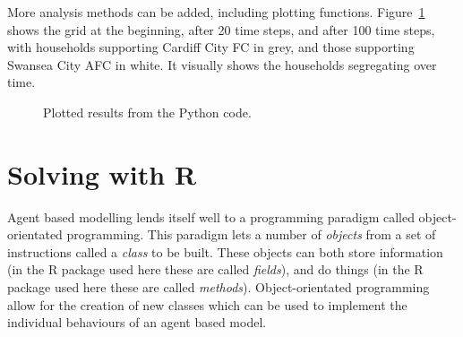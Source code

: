 More analysis methods can be added, including plotting functions.
Figure~\ref{fig:schelling_python_plot} shows the grid at the beginning, after 20
time steps, and after 100 time steps, with households supporting Cardiff City FC
in grey, and those supporting Swansea City AFC in white.
It visually shows the households segregating over time.

\begin{figure}
\begin{center}
\end{center}
\caption{Plotted results from the Python code.}
\label{fig:schelling_python_plot}
\end{figure}

\section{Solving with R}\label{sec:agent_based_simulation_solving-with-R}

Agent based modelling lends itself well to a programming paradigm called
object-orientated programming.
This paradigm lets a number of \textit{objects} from a set of instructions
called a \textit{class} to be built.
These objects can both store information (in the R package used here these are called
\textit{fields}), and do things (in the R package used here these are called
\textit{methods}).
Object-orientated programming allow for the creation of new classes which can be
used to implement the individual behaviours of an agent based model.

